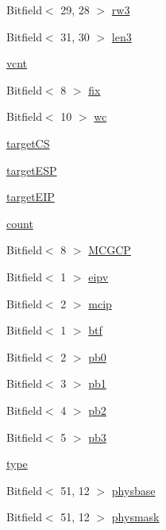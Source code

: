\begin{DoxyCompactItemize}
\item 
Bitfield$<$ 29, 28 $>$ \hyperlink{namespaceX86ISA_ab70a7eac186f998d01c6ff3047be03d3}{rw3}
\item 
Bitfield$<$ 31, 30 $>$ \hyperlink{namespaceX86ISA_a4a6fc36d3d43860a578343208b491b73}{len3}
\item 
\hyperlink{namespaceX86ISA_a425b4a7c6dd3e517b602f1dcbc49ea9e}{vcnt}
\item 
Bitfield$<$ 8 $>$ \hyperlink{namespaceX86ISA_ad2093a3e0b017036ef7d78a3422f07ab}{fix}
\item 
Bitfield$<$ 10 $>$ \hyperlink{namespaceX86ISA_ad0682dae36178efd9d37d2734c608898}{wc}
\item 
\hyperlink{namespaceX86ISA_a08e4bca3b92e32eaa3689adeef5a5044}{targetCS}
\item 
\hyperlink{namespaceX86ISA_a6b15f6256ffbee640517c6400f6e6e1b}{targetESP}
\item 
\hyperlink{namespaceX86ISA_a0e12d4aea7425cb8e3538d1c6da850c0}{targetEIP}
\item 
\hyperlink{namespaceX86ISA_a668f84c330035fdb72824eb18e09cd09}{count}
\item 
Bitfield$<$ 8 $>$ \hyperlink{namespaceX86ISA_a8d8243f77e193fb116fa1139f31e8a48}{MCGCP}
\item 
Bitfield$<$ 1 $>$ \hyperlink{namespaceX86ISA_a63c7a0901e839593b404e5ee80570959}{eipv}
\item 
Bitfield$<$ 2 $>$ \hyperlink{namespaceX86ISA_a02cdf394cc129c0926f666d0e1a89027}{mcip}
\item 
Bitfield$<$ 1 $>$ \hyperlink{namespaceX86ISA_aa3493c5a55b04a5f031fcee4d5a5ff1c}{btf}
\item 
Bitfield$<$ 2 $>$ \hyperlink{namespaceX86ISA_a91e09f1f8b26ad5c2f66cf75faca08bc}{pb0}
\item 
Bitfield$<$ 3 $>$ \hyperlink{namespaceX86ISA_a9768158300cb63c72dd2413ec6f51f96}{pb1}
\item 
Bitfield$<$ 4 $>$ \hyperlink{namespaceX86ISA_a3c0a389a1b560c8484527b312b36dcc1}{pb2}
\item 
Bitfield$<$ 5 $>$ \hyperlink{namespaceX86ISA_af62df4ed903772985379b4e8b82360a8}{pb3}
\item 
\hyperlink{namespaceX86ISA_ad805db903f6899f960fd9a982272096a}{type}
\item 
Bitfield$<$ 51, 12 $>$ \hyperlink{namespaceX86ISA_aa5bae97e6709df9ef51fef72b5c163de}{physbase}
\item 
Bitfield$<$ 51, 12 $>$ \hyperlink{namespaceX86ISA_a1af18e13c01770d0172b42eaadc445ac}{physmask}
\item 

\end{DoxyCompactItemize}
